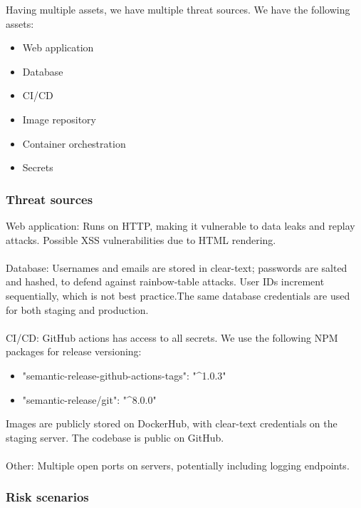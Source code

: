 
Having multiple assets, we have multiple threat sources.\newline 
We have the following assets:
\begin{itemize}
    \item Web application
    \item Database
    \item CI/CD
    \item Image repository
    \item Container orchestration
    \item Secrets
\end{itemize}

\subsubsection{Threat sources}

Web application: Runs on HTTP, making it vulnerable to data leaks and replay attacks. Possible XSS vulnerabilities due to HTML rendering.\\\\
Database: Usernames and emails are stored in clear-text; passwords are salted and hashed, to defend against rainbow-table attacks.
User IDs increment sequentially, which is not best practice.The same database credentials are used for both staging and production.\\\\
CI/CD: GitHub actions has access to all secrets.
We use the following NPM packages for release versioning:
\begin{itemize}
    \item "semantic-release-github-actions-tags": "\textasciicircum1.0.3"
    \item "semantic-release/git": "\textasciicircum8.0.0"
\end{itemize}

Images are publicly stored on DockerHub, with clear-text credentials on the staging server. The codebase is public on GitHub.\\\\
Other: Multiple open ports on servers, potentially including logging endpoints.

\subsubsection{Risk scenarios}

